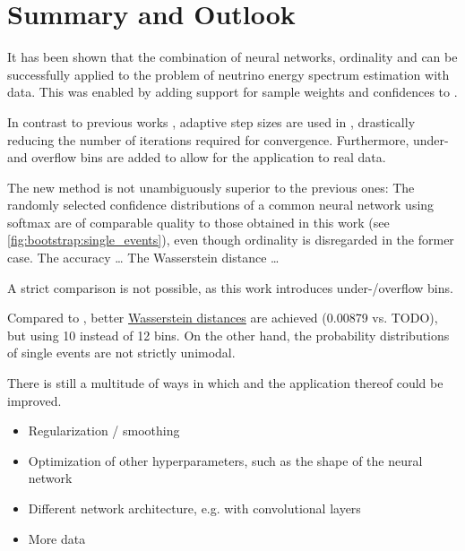 \chapter{Summary and Outlook} \label{sec:summary}

It has been shown that
the combination of neural networks, ordinality and \dsea{}
  can be successfully applied to
  the problem of neutrino energy spectrum estimation
  with \icecube{} data.
This was enabled by
  adding support for
    sample weights
    and confidences
  to \corn{}.

In contrast to previous works \cite{dsea_jan, dsea_samuel},
  adaptive step sizes \cite{dsea_mirko} are used in \dsea{},
    drastically reducing the number of iterations required for convergence.
Furthermore,
  under- and overflow bins are added
    to allow for the application to real data.

The new method is not unambiguously superior to the previous ones:
  The randomly selected confidence distributions of a common neural network using softmax \cite{dsea_samuel}
    are of comparable quality to those obtained in this work (see \autoref{fig:bootstrap:single_events}),
      even though ordinality is disregarded in the former case.
%
The accuracy …
The Wasserstein distance …

A strict comparison is not possible,
  as this work introduces under-/overflow bins.

Compared to \cite{dsea_jan},
  better \hyperref[sec:unfolding:metrics:wd]{Wasserstein distances} are achieved
    (\num{0.00879} vs. TODO),
    but using \num{10} instead of \num{12} bins.
On the other hand,
the probability distributions of single events are not strictly unimodal.


There is still a multitude of ways in which \dsea{} and the application thereof could be improved.
\begin{itemize}
  \item Regularization / smoothing
  \item Optimization of other hyperparameters, such as the shape of the neural network
  \item Different network architecture, e.g. with convolutional layers
  \item More data
\end{itemize}

